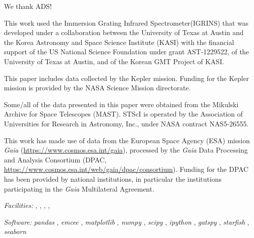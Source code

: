 \documentclass[twocolumn]{emulateapj}%
\newcommand{\project}[1]{\textsl{#1}}
\begin{document}
We thank ADS!

This work used the Immersion Grating Infrared Spectrometer(IGRINS) that was developed under a collaboration between the University of Texas at Austin and the Korea Astronomy and Space Science Institute (KASI) with the financial support of the US National Science Foundation under grant AST-1229522, of the University of Texas at Austin, and of the Korean GMT Project of KASI.

This paper includes data collected by the Kepler mission. Funding for the Kepler mission is provided by the NASA Science Mission directorate.

Some/all of the data presented in this paper were obtained from the Mikulski Archive for Space Telescopes (MAST). STScI is operated by the Association of Universities for Research in Astronomy, Inc., under NASA contract NAS5-26555.

This work has made use of data from the European Space Agency (ESA) mission
{\it Gaia} (\url{https://www.cosmos.esa.int/gaia}), processed by the {\it Gaia}
Data Processing and Analysis Consortium (DPAC,
\url{https://www.cosmos.esa.int/web/gaia/dpac/consortium}). Funding for the DPAC
has been provided by national institutions, in particular the institutions
participating in the {\it Gaia} Multilateral Agreement.


{\it Facilities:} , , , , 

{\it Software: }
 \project{pandas} \citep{mckinney10},
 \project{emcee} \citep{foreman13},
 \project{matplotlib} \citep{hunter07},
 \project{numpy} \citep{vanderwalt11},
 \project{scipy} \citep{jones01},
 \project{ipython} \citep{perez07},
 \project{gatspy} \citep{JakeVanderplas2015},
 \project{starfish} \citep{czekala15},
 \project{seaborn} \citep{waskom14}

\clearpage



\end{document}
